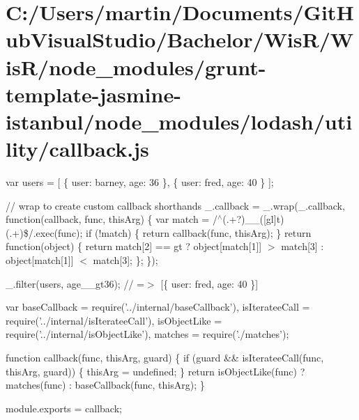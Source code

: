 \hypertarget{_c_1_2_users_2martin_2_documents_2_git_hub_visual_studio_2_bachelor_2_wis_r_2_wis_r_2node_module08d1a19557b8b1dc3c7501af5888cc69}{}\section{C\+:/\+Users/martin/\+Documents/\+Git\+Hub\+Visual\+Studio/\+Bachelor/\+Wis\+R/\+Wis\+R/node\+\_\+modules/grunt-\/template-\/jasmine-\/istanbul/node\+\_\+modules/lodash/utility/callback.\+js}
var users = \mbox{[} \{ \textquotesingle{}user\textquotesingle{}\+: \textquotesingle{}barney\textquotesingle{}, \textquotesingle{}age\textquotesingle{}\+: 36 \}, \{ \textquotesingle{}user\textquotesingle{}\+: \textquotesingle{}fred\textquotesingle{}, \textquotesingle{}age\textquotesingle{}\+: 40 \} \mbox{]};

// wrap to create custom callback shorthands \+\_\+.\+callback = \+\_\+.\+wrap(\+\_\+.\+callback, function(callback, func, this\+Arg) \{ var match = /$^\wedge$(.+?)\+\_\+\+\_\+(\mbox{[}gl\mbox{]}t)(.+)\$/.exec(func); if (!match) \{ return callback(func, this\+Arg); \} return function(object) \{ return match\mbox{[}2\mbox{]} == \textquotesingle{}gt\textquotesingle{} ? object\mbox{[}match\mbox{[}1\mbox{]}\mbox{]} $>$ match\mbox{[}3\mbox{]} \+: object\mbox{[}match\mbox{[}1\mbox{]}\mbox{]} $<$ match\mbox{[}3\mbox{]}; \}; \});

\+\_\+.\+filter(users, \textquotesingle{}age\+\_\+\+\_\+gt36\textquotesingle{}); // =$>$ \mbox{[}\{ \textquotesingle{}user\textquotesingle{}\+: \textquotesingle{}fred\textquotesingle{}, \textquotesingle{}age\textquotesingle{}\+: 40 \}\mbox{]}


\begin{DoxyCodeInclude}
var baseCallback = require(\textcolor{stringliteral}{'../internal/baseCallback'}),
    isIterateeCall = require(\textcolor{stringliteral}{'../internal/isIterateeCall'}),
    isObjectLike = require(\textcolor{stringliteral}{'../internal/isObjectLike'}),
    matches = require(\textcolor{stringliteral}{'./matches'});

\textcolor{keyword}{function} callback(func, thisArg, guard) \{
  \textcolor{keywordflow}{if} (guard && isIterateeCall(func, thisArg, guard)) \{
    thisArg = undefined;
  \}
  \textcolor{keywordflow}{return} isObjectLike(func)
    ? matches(func)
    : baseCallback(func, thisArg);
\}

module.exports = callback;
\end{DoxyCodeInclude}
 